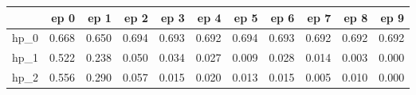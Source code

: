 \begin{tabular}{lrrrrrrrrrr}
\toprule
{} &   ep 0 &   ep 1 &   ep 2 &   ep 3 &   ep 4 &   ep 5 &   ep 6 &   ep 7 &   ep 8 &   ep 9 \\
\midrule
hp\_0 &  0.668 &  0.650 &  0.694 &  0.693 &  0.692 &  0.694 &  0.693 &  0.692 &  0.692 &  0.692 \\
hp\_1 &  0.522 &  0.238 &  0.050 &  0.034 &  0.027 &  0.009 &  0.028 &  0.014 &  0.003 &  0.000 \\
hp\_2 &  0.556 &  0.290 &  0.057 &  0.015 &  0.020 &  0.013 &  0.015 &  0.005 &  0.010 &  0.000 \\
\bottomrule
\end{tabular}
